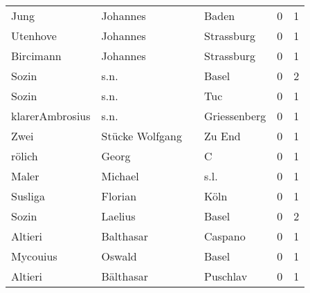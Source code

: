 \begin{center}
\begin{tiny}
\begin{longtabu}{llllrr}
                     Jung &                           Johannes &             &                                       Baden &          0 &         1 \\
                 Utenhove &                           Johannes &             &                                  Strassburg &          0 &         1 \\
                Bircimann &                           Johannes &             &                                  Strassburg &          0 &         1 \\
                    Sozin &                               s.n. &             &                                       Basel &          0 &         2 \\
                    Sozin &                               s.n. &             &                                         Tuc &          0 &         1 \\
          klarerAmbrosius &                               s.n. &             &                                Griessenberg &          0 &         1 \\
                     Zwei &                    Stücke Wolfgang &             &                                      Zu End &          0 &         1 \\
                   rölich &                              Georg &             &                                           C &          0 &         1 \\
                    Maler &                            Michael &             &                                        s.l. &          0 &         1 \\
                  Susliga &                            Florian &             &                                        Köln &          0 &         1 \\
                    Sozin &                            Laelius &             &                                       Basel &          0 &         2 \\
                  Altieri &                          Balthasar &             &                                     Caspano &          0 &         1 \\
                 Mycouius &                             Oswald &             &                                       Basel &          0 &         1 \\
                  Altieri &                          Bälthasar &             &                                    Puschlav &          0 &         1 \\

\end{longtabu}
\end{tiny}
\end{center}
